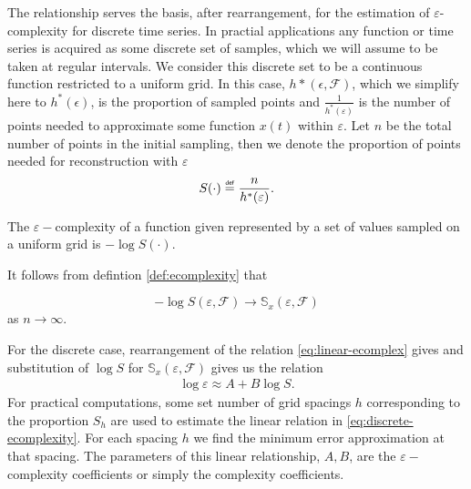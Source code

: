   The relationship serves the basis, after rearrangement, 
  for the estimation of $\varepsilon$-complexity for 
  discrete time series.
  In practial applications any function or time series 
  is acquired as some discrete set of samples, which we
  will assume to be taken at regular intervals. We 
  consider this discrete set to be a continuous function
  restricted to a uniform grid. In this case, 
  $h*(\epsilon, \mathcal{F})$, which we simplify here to 
  $h^*(\epsilon)$, is the proportion of sampled points
  and $\frac{1}{h^*(\varepsilon)}$ is the 
  number of points needed to approximate some function $x(t)$ within 
  $\varepsilon$. Let $n$ be the total number of points 
  in the initial sampling, then we denote the 
  proportion of points needed for reconstruction with 
  $\varepsilon$ 
  \begin{align}
     S(\cdot) \defeq \frac{n}{h^*(\varepsilon)}.
   \end{align} 
   \begin{defn}
     The $\varepsilon-$complexity of a function 
     given represented by a set of values sampled on 
     a uniform grid is $-\log S(\cdot)$.
   \end{defn}
  It follows from defintion \ref{def:ecomplexity} that
  \begin{prop}
    \[
      -\log S(\varepsilon, \mathcal{F}) \to \mathbb{S}_x(\varepsilon, \mathcal{F}) 
    \]
    as $n \to \infty$.
  \end{prop}
  For the discrete case, rearrangement of the relation \ref{eq:linear-ecomplex} gives and substitution of $\log S$ for $\mathbb{S}_x(\varepsilon, \mathcal{F})$ gives us the relation
  \begin{align}\label{eq:discrete-ecomplexity}
     \log \varepsilon  \approx A + B \log S.
   \end{align} 
  For practical computations, some set number of grid spacings 
  $h$ corresponding to the proportion $S_h$ are used to 
  estimate the linear relation in \ref{eq:discrete-ecomplexity}. 
  For each spacing $h$ we find the minimum error approximation 
  at that spacing.
  The parameters of this linear relationship, $A, B$, are the 
  $\varepsilon-$complexity coefficients or simply the  
  complexity coefficients. 

  


